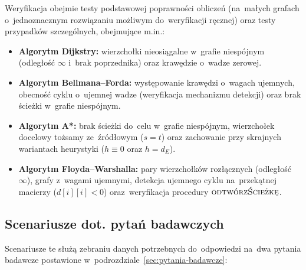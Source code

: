 \documentclass[11pt,a4paper,oneside]{report}
\begin{document}
Weryfikacja obejmie testy podstawowej poprawności obliczeń (na~małych grafach o~jednoznacznym rozwiązaniu możliwym do~weryfikacji ręcznej) oraz testy przypadków szczególnych, obejmujące m.in.:
\begin{itemize}
  \item \textbf{Algorytm Dijkstry:} wierzchołki nieosiągalne w~grafie niespójnym (odległość $\infty$ i~brak poprzednika) oraz krawędzie o~wadze zerowej.
  \item \textbf{Algorytm Bellmana--Forda:} występowanie krawędzi o~wagach ujemnych, obecność cyklu o~ujemnej wadze (weryfikacja mechanizmu detekcji) oraz brak ścieżki w~grafie niespójnym.
  \item \textbf{Algorytm A*:} brak ścieżki do~celu w~grafie niespójnym, wierzchołek docelowy tożsamy ze~źródłowym ($s = t$) oraz zachowanie przy skrajnych wariantach heurystyki ($h \equiv 0$ oraz $h = d_E$).
  \item \textbf{Algorytm Floyda--Warshalla:} pary wierzchołków rozłącznych (odległość $\infty$), grafy z~wagami ujemnymi, detekcja ujemnego cyklu na~przekątnej macierzy ($d[i][i] < 0$) oraz~weryfikacja procedury $\textsc{odtwórzŚcieżkę}$.
\end{itemize} 

\subsection{Scenariusze dot. pytań badawczych}

Scenariusze te służą zebraniu danych potrzebnych do~odpowiedzi na~dwa pytania badawcze postawione w~podrozdziale~\ref{sec:pytania-badawcze}:
\end{document}
